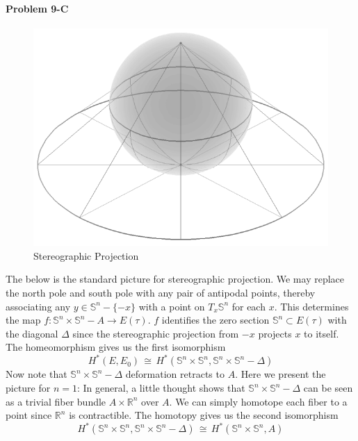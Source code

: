 \documentclass[12pt]{article}
\theoremstyle{plain}
\theoremstyle{definition}
\newcommand{\IR}{\mathbb{R}}
\newcommand{\IS}{\mathbb{S}}
\newcommand\iso{\,{\cong}\,}
\newcommand{\<}{\langle}
\renewcommand{\>}{\rangle}
\begin{document}
\paragraph{Problem 9-C} 

\begin{figure}[h!]
    \centering
    \includegraphics[scale=0.2]{Stereographic_projection.png}
    \caption{Stereographic Projection}
    \label{fig:awesome_image}
\end{figure}

The below is the standard picture for stereographic projection. We may replace the north pole and south pole with any pair of antipodal points, thereby associating any $ y \in \IS^n - \{ -x \}$ with a point on $T_x \IS^n$ for each $x$. This determines the map $f : \IS^n \times \IS^n - A \to E(\tau)$. $f$ identifies the zero section $\IS^n \subset E(\tau)$ with the diagonal $\Delta$ since the stereographic projection from $-x$ projects $x$ to itself. The homeomorphism gives us the first isomorphism 
$$ H^*(E, E_0) \iso H^*(\IS^n \times \IS^n, \IS^n \times \IS^n - \Delta) $$
Now note that $\IS^n \times \IS^n - \Delta$ deformation retracts to $A$. Here we present the picture for $n = 1$: 
In general, a little thought shows that $\IS^n \times \IS^n - \Delta$ can be seen as a trivial fiber bundle $A \times \IR^n$ over $A$. We can simply homotope each fiber to a point since $\IR^n$ is contractible. The homotopy gives us the second isomorphism
$$ H^*(\IS^n \times \IS^n, \IS^n \times \IS^n - \Delta) \iso H^*(\IS^n \times \IS^n, A) $$
\end{document}
